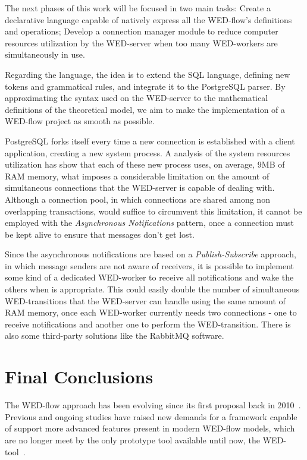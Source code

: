 \documentclass[12pt]{article}
\begin{document}

The next phases of this work will be focused in two main tasks: Create a declarative language capable of natively express all
the WED-flow's definitions and operations; Develop a connection manager module to reduce computer resources utilization
by the WED-server when too many WED-workers are simultaneously in use.    

Regarding the language, the idea is to extend the SQL language, defining new tokens and grammatical rules, and integrate it
to the PostgreSQL parser. By approximating the syntax used on the WED-server to the mathematical definitions of the theoretical 
model, we aim to make the implementation of a WED-flow project as smooth as possible. 

PostgreSQL forks itself every time a new connection is established with a client application, creating a new system process.
A analysis of the system resources utilization has show that each of these new process uses, on average, 9MB of RAM memory,
what imposes a considerable limitation on the amount of simultaneous connections that the WED-server is capable of dealing with.
Although a connection pool, in which connections are shared among non overlapping transactions, would
suffice to circumvent this limitation, it cannot be employed with the \emph{Asynchronous Notifications} pattern, once a connection
must be kept alive to ensure that messages don't get lost.

Since the asynchronous notifications are based on a \emph{Publish-Subscribe} approach, in which message senders are not
aware of receivers, it is possible to implement some kind of a dedicated WED-worker to receive all notifications and wake
the others when is appropriate. This could easily double the number of simultaneous WED-transitions that the WED-server
can handle using the same amount of RAM memory, once each WED-worker currently needs two connections - one to receive notifications
and another one to perform the WED-transition. There is also some third-party solutions like the RabbitMQ software.


\section{Final Conclusions}

The WED-flow approach has been evolving since its first proposal back in 2010~\cite{FTPM10}. Previous and ongoing studies
have raised new demands for a framework capable of support more advanced features present in modern WED-flow models, which
are no longer meet by the only prototype tool available until now, the WED-tool~\cite{WT}. 
\end{document}
